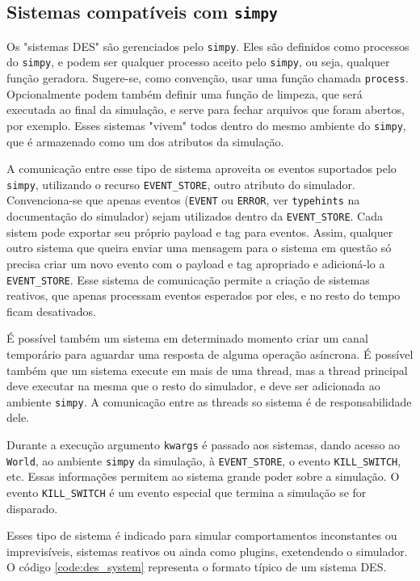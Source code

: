 \subsection{Sistemas compatíveis com \texttt{simpy}}
\label{sec:des_systems}

Os "sistemas DES" são gerenciados pelo \texttt{simpy}. Eles são definidos como processos do \texttt{simpy}, e podem ser qualquer processo aceito pelo \texttt{simpy}, ou seja, qualquer função geradora. Sugere-se, como convenção, usar uma função chamada \texttt{process}. Opcionalmente podem também definir uma função de limpeza, que será executada ao final da simulação, e serve para fechar arquivos que foram abertos, por exemplo. Esses sistemas "vivem" todos dentro do mesmo ambiente do \texttt{simpy}, que é armazenado como um dos atributos da simulação.

A comunicação entre esse tipo de sistema aproveita os eventos suportados pelo \texttt{simpy}, utilizando o recurso \texttt{EVENT\_STORE}, outro atributo do simulador. Convenciona-se que apenas eventos (\texttt{EVENT} ou \texttt{ERROR}, ver \texttt{typehints} na documentação do simulador) sejam utilizados dentro da \texttt{EVENT\_STORE}. Cada sistem pode exportar seu próprio payload e tag para eventos. Assim, qualquer outro sistema que queira enviar uma mensagem para o sistema em questão só precisa criar um novo evento com o payload e tag apropriado e adicioná-lo a \texttt{EVENT\_STORE}. Esse sistema de comunicação permite a criação de sistemas reativos, que apenas processam eventos esperados por eles, e no resto do tempo ficam desativados.

É possível também um sistema em determinado momento criar um canal temporário para aguardar uma resposta de alguma operação asíncrona. É possível também que um sistema execute em mais de uma thread, mas a thread principal deve executar na mesma que o resto do simulador, e deve ser adicionada ao ambiente \texttt{simpy}. A comunicação entre as threads so sistema é de responsabilidade dele.

Durante a execução argumento \texttt{kwargs} é passado aos sistemas, dando acesso ao \texttt{World}, ao ambiente \texttt{simpy} da simulação, à \texttt{EVENT\_STORE}, o evento \texttt{KILL\_SWITCH}, etc. Essas informações permitem ao sistema grande poder sobre a simulação. O evento \texttt{KILL\_SWITCH} é um evento especial que termina a simulação se for disparado.

Esses tipo de sistema é indicado para simular comportamentos inconstantes ou imprevisíveis, sistemas reativos ou ainda como plugins, exetendendo o simulador. O código \ref{code:des_system} representa o formato típico de um sistema DES.

